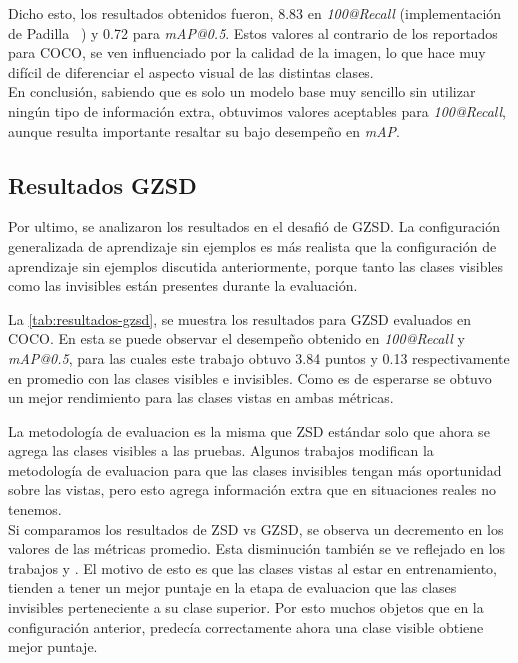 Dicho esto, los resultados obtenidos fueron, 8.83 en \textit{100@Recall} (implementación de Padilla \etal~\cite{padilla2020survey}) y 0.72 para \textit{mAP@0.5}. Estos valores al contrario de los reportados para COCO, se ven influenciado por la calidad de la imagen, lo que hace muy difícil de diferenciar el aspecto visual de las distintas clases.\\

En conclusión, sabiendo que es solo un modelo base muy sencillo sin utilizar ningún tipo de información extra, obtuvimos valores aceptables para \textit{100@Recall}, aunque resulta importante resaltar su bajo desempeño en \textit{mAP}. 

\subsection{Resultados GZSD}
Por ultimo, se analizaron los resultados en el desafió de GZSD. La configuración generalizada de aprendizaje sin ejemplos es más realista que la configuración de aprendizaje sin ejemplos discutida anteriormente, porque tanto las clases visibles como las invisibles están presentes durante la evaluación.

La \autoref{tab:resultados-gzsd}, se muestra los resultados para GZSD evaluados en COCO. En esta se puede observar el desempeño obtenido en \textit{100@Recall} y \textit{mAP@0.5}, para las cuales este trabajo obtuvo 3.84 puntos y 0.13 respectivamente en promedio con las clases visibles e invisibles. Como es de esperarse se obtuvo un mejor rendimiento para las clases vistas en ambas métricas.

La metodología de evaluacion es la misma que ZSD estándar solo que ahora se agrega las clases visibles a las pruebas. Algunos trabajos modifican la metodología de evaluacion para que las clases invisibles tengan más oportunidad sobre las vistas, pero esto agrega información extra que en situaciones reales no tenemos.\\

Si comparamos los resultados de ZSD vs GZSD, se observa un decremento en los valores de las métricas promedio. Esta disminución también se ve reflejado en los trabajos \cite{bansal2018zero} y \cite{rahman2020zero}. El motivo de esto es que las clases vistas al estar en entrenamiento, tienden a tener un mejor puntaje en la etapa de evaluacion que las clases invisibles perteneciente a su clase superior. Por esto muchos objetos que en la configuración anterior, predecía correctamente ahora una clase visible obtiene mejor puntaje.\\


